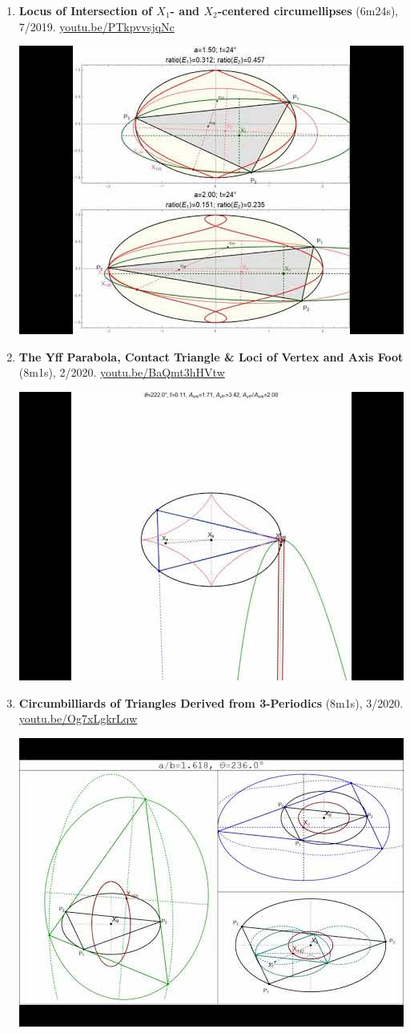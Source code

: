 \documentclass[12pt]{article}
\begin{document}
\begin{enumerate}[resume]
% 
\item \textbf{Locus of Intersection of $X_{1}$- and $X_{2}$-centered circumellipses} (6m24s), 7/2019. \href{https://youtu.be/PTkpvvsjqNc}{\url{youtu.be/PTkpvvsjqNc}}
\begin{center}\includegraphics[width=.5\textwidth]{pics/PTkpvvsjqNc.jpg}\end{center}
% 
\item \textbf{The Yff Parabola, Contact Triangle \& Loci of Vertex and Axis Foot} (8m1s), 2/2020. \href{https://youtu.be/BaQmt3hHVtw}{\url{youtu.be/BaQmt3hHVtw}}
\begin{center}\includegraphics[width=.5\textwidth]{pics/BaQmt3hHVtw.jpg}\end{center}
% 
\item \textbf{Circumbilliards of Triangles Derived from 3-Periodics} (8m1s), 3/2020. \href{https://youtu.be/Og7xLgkrLqw}{\url{youtu.be/Og7xLgkrLqw}}
\begin{center}\includegraphics[width=.5\textwidth]{pics/Og7xLgkrLqw.jpg}\end{center}

\end{enumerate}
\end{document}
